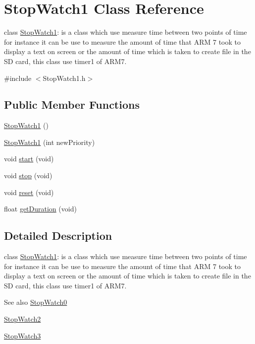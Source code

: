 \hypertarget{class_stop_watch1}{
\section{StopWatch1 Class Reference}
\label{class_stop_watch1}
}


class \hyperlink{class_stop_watch1}{StopWatch1}: is a class which use measure time between two points of time for instance it can be use to measure the amount of time that ARM 7 took to display a text on screen or the amount of time which is taken to create file in the SD card, this class use timer1 of ARM7.  




{\ttfamily \#include $<$StopWatch1.h$>$}

\subsection*{Public Member Functions}
\begin{DoxyCompactItemize}
\item 
\hyperlink{class_stop_watch1_a32ea8f18f33abc8c12d2d3240d0c05bd}{StopWatch1} ()
\item 
\hyperlink{class_stop_watch1_a7897795aab816f5cee62eaafcd0615de}{StopWatch1} (int newPriority)
\item 
void \hyperlink{class_stop_watch1_a0bee387e1784d1731703a16661ff47bb}{start} (void)
\item 
void \hyperlink{class_stop_watch1_a93736e1be2c32a13b7a20a1a19809480}{stop} (void)
\item 
void \hyperlink{class_stop_watch1_a3676c3234e357cd3dabe89a578df8716}{reset} (void)
\item 
float \hyperlink{class_stop_watch1_a2dca9c012a952a2ddcef6011fb6a7d54}{getDuration} (void)
\end{DoxyCompactItemize}


\subsection{Detailed Description}
class \hyperlink{class_stop_watch1}{StopWatch1}: is a class which use measure time between two points of time for instance it can be use to measure the amount of time that ARM 7 took to display a text on screen or the amount of time which is taken to create file in the SD card, this class use timer1 of ARM7. 

\begin{DoxySeeAlso}{See also}
\hyperlink{class_stop_watch0}{StopWatch0} 

\hyperlink{class_stop_watch2}{StopWatch2} 

\hyperlink{class_stop_watch3}{StopWatch3} 
\end{DoxySeeAlso}


